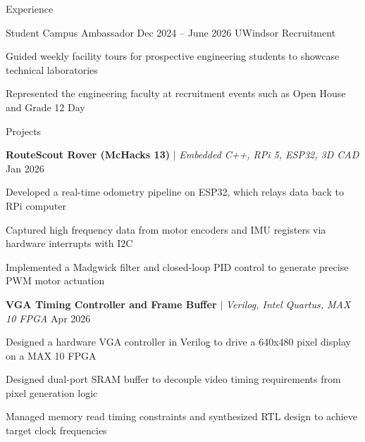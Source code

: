 \documentclass{template} %
\begin{document}
\begin{rSection}{Experience}
\begin{rWorkSection}{Student Campus Ambassador}
                      {Dec 2024 -- June 2026}
                      {UWindsor Recruitment}
                      {}
{
  \item Guided weekly facility tours for prospective engineering students to showcase technical laboratories
  \item Represented the engineering faculty at recruitment events such as Open House and Grade 12 Day
  
} \end{rWorkSection}
\vspace{0.1em}

\end{rSection}

 

\begin{rSection}{Projects}

    \textbf{RouteScout Rover (McHacks 13) } $|$ \textit{Embedded C++, RPi 5, ESP32, 3D CAD} \hfill Jan 2026
            \vspace{0.2em}
    \begin{rProjectSection}
        \item Developed a real-time odometry pipeline on ESP32, which relays data back to RPi computer
        \item Captured high frequency data from motor encoders and IMU registers via hardware interrupts with I2C
        \item Implemented a Madgwick filter and closed-loop PID control to generate precise PWM motor actuation
    \end{rProjectSection}

    \vspace{0.3em} 
    \textbf{VGA Timing Controller and Frame Buffer } $|$ \textit{Verilog, Intel Quartus, MAX 10 FPGA} \hfill {Apr 2026}
        \vspace{0.2em}
    \begin{rProjectSection}
        \item Designed a hardware VGA controller in Verilog to drive a 640x480 pixel display on a MAX 10 FPGA
        \item Designed dual-port SRAM buffer to decouple video timing requirements from pixel generation logic
        \item Managed memory read timing constraints and synthesized RTL design to achieve target clock frequencies
    \end{rProjectSection}
    
\end{rSection}
\vspace{0.4em}
\end{document}
